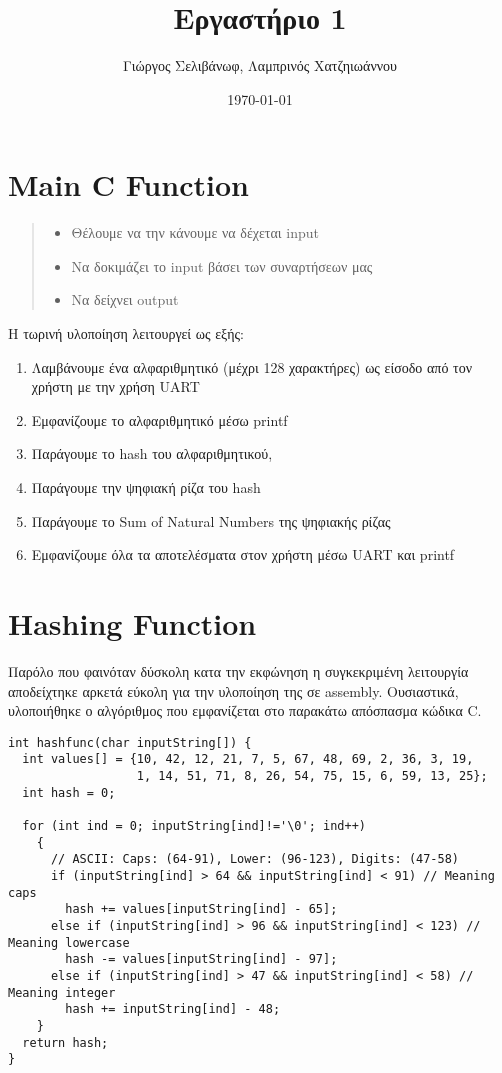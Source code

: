 \documentclass[11pt]{article}
\author{Γιώργος Σελιβάνωφ, Λαμπρινός Χατζηιωάννου}
\date{\today}
\title{Εργαστήριο 1}
\begin{document}
\maketitle
\justifying
\section{Main C Function}
\label{sec:org4d2587c}

\begin{quote}
\begin{itemize}
\item Θέλουμε να την κάνουμε να δέχεται input
\item Να δοκιμάζει το input βάσει των συναρτήσεων μας
\item Να δείχνει output
\end{itemize}
\end{quote}

Η τωρινή υλοποίηση λειτουργεί ως εξής:
\begin{enumerate}
\item Λαμβάνουμε ένα αλφαριθμητικό (μέχρι 128 χαρακτήρες) ως είσοδο από τον χρήστη με την χρήση UART
\item Εμφανίζουμε το αλφαριθμητικό μέσω printf
\item Παράγουμε το hash του αλφαριθμητικού,
\item Παράγουμε την ψηφιακή ρίζα του hash
\item Παράγουμε το Sum of Natural Numbers της ψηφιακής ρίζας
\item Εμφανίζουμε όλα τα αποτελέσματα στον χρήστη μέσω UART και printf
\end{enumerate}
\section{Hashing Function}
\label{sec:org5b6cad2}
Παρόλο που φαινόταν δύσκολη κατα την εκφώνηση η συγκεκριμένη
λειτουργία αποδείχτηκε αρκετά εύκολη για την υλοποίηση της σε
assembly. Ουσιαστικά, υλοποιήθηκε ο αλγόριθμος που εμφανίζεται
στο παρακάτω απόσπασμα κώδικα C.

\begin{verbatim}
int hashfunc(char inputString[]) {
  int values[] = {10, 42, 12, 21, 7, 5, 67, 48, 69, 2, 36, 3, 19,
                  1, 14, 51, 71, 8, 26, 54, 75, 15, 6, 59, 13, 25};
  int hash = 0;

  for (int ind = 0; inputString[ind]!='\0'; ind++)
    {
      // ASCII: Caps: (64-91), Lower: (96-123), Digits: (47-58)
      if (inputString[ind] > 64 && inputString[ind] < 91) // Meaning caps
        hash += values[inputString[ind] - 65];
      else if (inputString[ind] > 96 && inputString[ind] < 123) // Meaning lowercase
        hash -= values[inputString[ind] - 97];
      else if (inputString[ind] > 47 && inputString[ind] < 58) // Meaning integer
        hash += inputString[ind] - 48;
    }
  return hash;
}

\end{verbatim}
\end{document}
